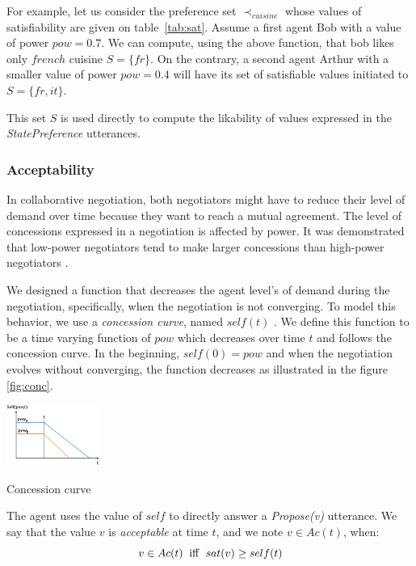 \documentclass[conference, letterpaper]{IEEEtran}
\begin{document}
	For example, let us consider the preference set $\prec_{cuisine}$ whose values of satisfiability are given on table~\ref{tab:sat}. Assume a first agent Bob with a value of power $pow = 0.7$. We can compute, using the above function, that bob likes only $french$ cuisine $S= \{fr\}$. On the contrary, a second agent Arthur with a smaller value of power $pow=0.4$ will have its set of satisfiable values initiated to $S= \{fr, it\}$. 
	
    This set $S$ is used directly to compute the likability of values expressed in the \emph{StatePreference} utterances.
	
	\subsubsection{Acceptability}
	\label{sec:acc}
	In collaborative negotiation, both negotiators might have to reduce their level of demand over time because they want to reach a mutual agreement. The level of concessions expressed in a negotiation is affected by power. It was demonstrated that low-power negotiators tend to make larger concessions than high-power negotiators \cite{de1995impact}.
	
	We designed a function that decreases the agent level's of demand during the negotiation, specifically, when the negotiation is not converging.  To model this behavior, we use a \emph{concession curve}, named $self(t)$ . %
	We define this function to be a time varying function of $pow$ which decreases over time $t$ and follows the concession curve. In the beginning, $self(0) = pow$ and when the negotiation evolves without converging, the function decreases as illustrated in the figure \ref{fig:conc}.
	
	
	\begin{floatingfigure}[l]{1.2in}
		\captionsetup{justification=centering}
		\includegraphics[width=1.2in]{figs/s3.png}
		\caption{\label{fig:conc}Concession curve}
	\end{floatingfigure} 
	
	
	The agent uses the value of $self$ to directly answer a \emph{Propose(v)} utterance. We say that the value $v$ is \emph{acceptable} at time $t$, and we note $v \in Ac(t)$, when:
	\begin{equation}
	v\in Ac(t)\hspace{2mm}\mathrm{iff}\hspace{2mm}sat(v) \geq self(t)
	\end{equation}
	
\end{document}
